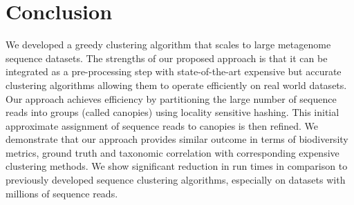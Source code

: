 \documentclass[letterpaper,twocolumn]{article}
\begin{document}
\section{Conclusion}
\label{sec:Conclusion}
We developed a greedy clustering algorithm 
that scales to large metagenome sequence datasets. The strengths of our proposed approach is that it can be integrated as a pre-processing step
with state-of-the-art expensive but accurate clustering algorithms allowing them to
operate efficiently on real world datasets. 
%
Our approach 
achieves efficiency 
by  
partitioning the large number of sequence reads into 
groups (called canopies) using locality sensitive 
hashing.  This 
initial approximate assignment of sequence reads to 
canopies is then 
refined. We demonstrate that our 
approach provides similar outcome in terms of biodiversity metrics, ground truth and taxonomic correlation with corresponding expensive clustering methods.
%
We show significant reduction in run times in comparison to previously developed sequence 
clustering algorithms, especially on datasets with millions of sequence reads.



 
\end{document}
